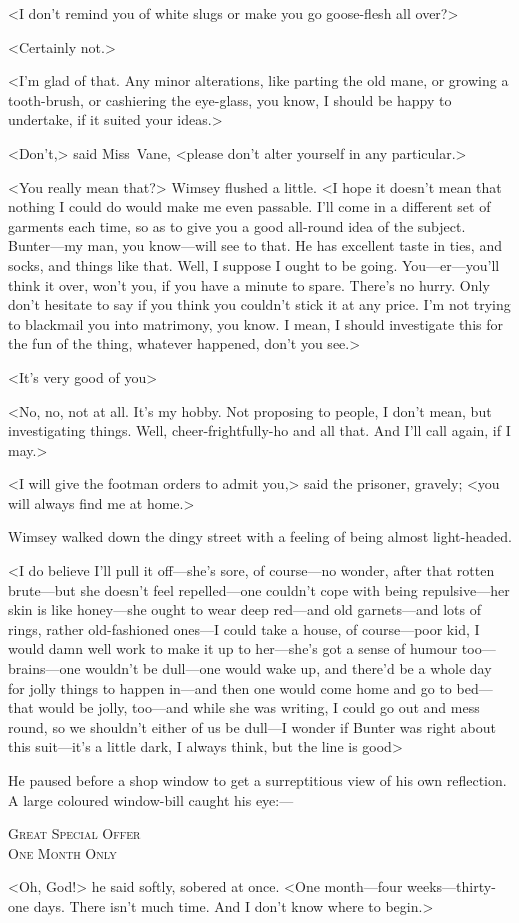<I don't remind you of white slugs or make you go goose-flesh all over?>

<Certainly not.>

<I'm glad of that. Any minor alterations, like parting the old mane, or growing a tooth-brush, or cashiering the eye-glass, you know, I should be happy to undertake, if it suited your ideas.>

<Don't,> said Miss~Vane, <please don't alter yourself in any particular.>

<You really mean that?> Wimsey flushed a little. <I hope it doesn't mean that nothing I could do would make me even passable. I'll come in a different set of garments each time, so as to give you a good all-round idea of the subject. Bunter—my man, you know—will see to that. He has excellent taste in ties, and socks, and things like that. Well, I suppose I ought to be going. You—er—you'll think it over, won't you, if you have a minute to spare. There's no hurry. Only don't hesitate to say if you think you couldn't stick it at any price. I'm not trying to blackmail you into matrimony, you know. I mean, I should investigate this for the fun of the thing, whatever happened, don't you see.>

<It's very good of you\longdash>

<No, no, not at all. It's my hobby. Not proposing to people, I don't mean, but investigating things. Well, cheer-frightfully-ho and all that. And I'll call again, if I may.>

<I will give the footman orders to admit you,> said the prisoner, gravely; <you will always find me at home.>

\divider

Wimsey walked down the dingy street with a feeling of being almost light-headed.

<I do believe I'll pull it off—she's sore, of course—no wonder, after that rotten brute—but she doesn't feel repelled—one couldn't cope with being repulsive—her skin is like honey—she ought to wear deep red—and old garnets—and lots of rings, rather old-fashioned ones—I could take a house, of course—poor kid, I would damn well work to make it up to her—she's got a sense of humour too—brains—one wouldn't be dull—one would wake up, and there'd be a whole day for jolly things to happen in—and then one would come home and go to bed—that would be jolly, too—and while she was writing, I could go out and mess round, so we shouldn't either of us be dull—I wonder if Bunter was right about this suit—it's a little dark, I always think, but the line is good\longdash>

He paused before a shop window to get a surreptitious view of his own reflection. A large coloured window-bill caught his eye:—

\begin{center}\scshape
Great Special Offer\\ One Month Only
\end{center}

<Oh, God!> he said softly, sobered at once. <One month—four weeks—thirty-one days. There isn't much time. And I don't know where to begin.>